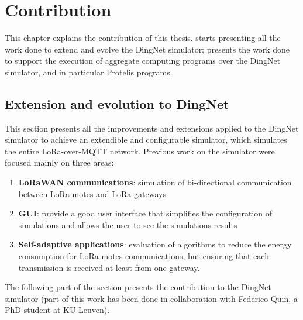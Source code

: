 

\chapter{Contribution}
\label{chap:contribution}
This chapter explains the contribution of this thesis.  starts presenting all the work done to extend and evolve the DingNet simulator;  presents  the work done to support the execution of aggregate computing programs over the DingNet simulator, and in particular Protelis programs. 

\section{Extension and evolution to DingNet}
\label{sec:contributionDingNet}
This section presents all the improvements and extensions applied to the DingNet simulator to achieve an extendible and configurable simulator, which simulates the entire LoRa-over-MQTT network. 
Previous work on the simulator were focused mainly on three areas:
\begin{enumerate}
    \item \textbf{LoRaWAN communications}: simulation of bi-directional communication between LoRa motes and LoRa gateways
    \item \textbf{GUI}: provide a good user interface that simplifies the configuration of simulations and allows the user to see the simulations results
    \item \textbf{Self-adaptive applications}: evaluation of algorithms to reduce the energy consumption for LoRa motes communications, but ensuring that each transmission is received at least from one gateway.
\end{enumerate}
The following part of the section presents the contribution to the DingNet simulator (part of this work has been done in collaboration with Federico Quin, a PhD student at KU Leuven).
\clearpage
